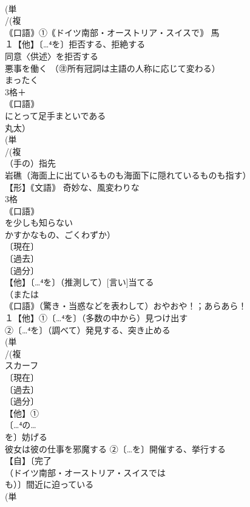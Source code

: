 \documentclass[8pt]{extreport}
\begin{document}
\begin{CJK}{UTF8}{min}
\\	(単
\\	/(複
\\	｟口語｠①｟ドイツ南部・オーストリア・スイスで｠ 馬 
\\	１【他】〔…⁴を〕拒否する、拒絶する 
\\	同意〈供述〉を拒否する 
\\	悪事を働く （㊟所有冠詞は主語の人称に応じて変わる）
\\	まったく
\\	3格＋
\\	｟口語｠ 
\\	にとって足手まといである 
\\	丸太）
\\	(単
\\	/(複
\\	（手の）指先 
\\	岩礁（海面上に出ているものも海面下に隠れているものも指す） 
\\	【形】｟文語｠ 奇妙な、風変わりな 
\\	3格 
\\	｟口語｠ 
\\	を少しも知らない 
\\	かすかなもの、ごくわずか）
\\	〔現在〕
\\	〔過去〕
\\	〔過分〕
\\	【他】〔…⁴を〕（推測して）[言い]当てる 
\\	（または
\\	｟口語｠（驚き・当惑などを表わして）おやおや！；あらあら！ 
\\	１【他】①〔…⁴を〕（多数の中から）見つけ出す 
\\	②〔…⁴を〕（調べて）発見する、突き止める
\\	(単
\\	/(複
\\	スカーフ 
\\	〔現在〕
\\	〔過去〕
\\	〔過分〕
\\	【他】①
\\	〔…⁴の…
\\	を〕妨げる 
\\	彼女は彼の仕事を邪魔する ②〔…を〕開催する、挙行する
\\	【自】〔完了
\\	（ドイツ南部・オーストリア・スイスでは
\\	も）〕間近に迫っている 
\\	(単

\end{CJK}
\end{document}
